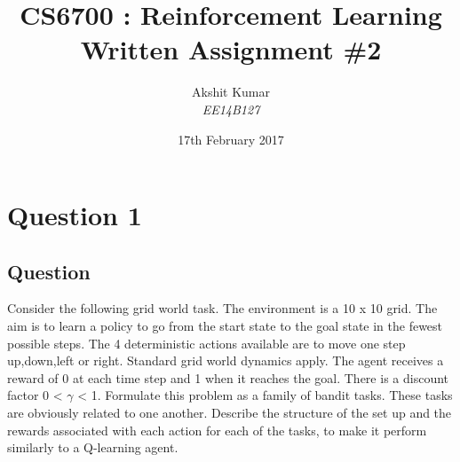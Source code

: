 \documentclass[english]{article}
\begin{document}
\title{\huge{\textbf{CS6700 : Reinforcement Learning \\ Written Assignment \#2}}}
\author{Akshit Kumar \\ \emph{EE14B127}}
\date{17th February 2017}

\maketitle
\tableofcontents{}

\section{Question 1}
\subsection{Question}
Consider the following grid world task. The environment is a 10 x 10 grid. The aim is to learn a policy to go from the start state to the goal state in the fewest possible steps. The 4 deterministic actions available are to move one step up,down,left or right. Standard grid world dynamics apply. The agent receives a reward of 0 at each time step and 1 when it reaches the goal. There is a discount factor 0 < $\gamma$ < 1. Formulate this problem as a family of bandit tasks. These tasks are obviously related to one another. Describe the structure of the set up and the rewards associated with each action for each of the tasks, to make it perform similarly to a Q-learning agent.
\end{document}
